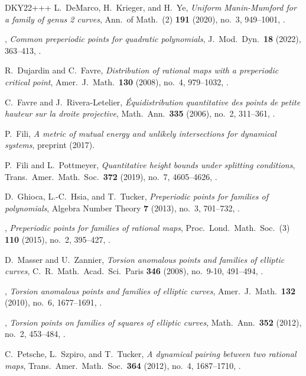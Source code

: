 \begin{thebibliography}{DKY22+++}
L.~DeMarco, H.~Krieger, and H.~Ye,
\emph{Uniform Manin-Mumford for a family of genus 2 curves},
Ann.\ of Math.~(2) \textbf{191} (2020), no.~3, 949--1001,
. 

\bysame, 
\emph{Common preperiodic points for quadratic polynomials},
J.~Mod.\ Dyn.\ \textbf{18} (2022), 363--413,
.

R.~Dujardin and C.~Favre,
\emph{Distribution of rational maps with a preperiodic critical point},
Amer.~J.\ Math.\ \textbf{130} (2008), no.~4, 979--1032,
.

C.~Favre and J.~Rivera-Letelier,
\emph{\'Equidistribution quantitative des points de petite hauteur sur la droite projective}, 
Math.\ Ann.\ \textbf{335} (2006), no.~2, 311--361,
.

P.~Fili,
\emph{A metric of mutual energy and unlikely intersections for dynamical systems}, preprint  (2017). 

P.~Fili and L.~Pottmeyer,
\emph{Quantitative height bounds under splitting conditions},
Trans.\ Amer.\ Math.\ Soc.\ \textbf{372} (2019), no.~7, 4605--4626,
.

D.~Ghioca, L.-C.~Hsia, and T.~Tucker,
\emph{Preperiodic points for families of polynomials},
Algebra Number Theory \textbf{7} (2013), no.~3, 701--732,
.

\bysame, 
\emph{Preperiodic points for families of rational maps},
Proc.\ Lond.\ Math.\ Soc.~(3) \textbf{110} (2015), no.~2, 395--427,
.

D.~Masser and U.~Zannier,
\emph{Torsion anomalous points and families of elliptic curves},
C.\ R.\ Math.\ Acad.\ Sci.\ Paris \textbf{346} (2008), no.~9-10, 491--494,
.

\bysame, 
\emph{Torsion anomalous points and families of elliptic curves},
Amer.~J.\ Math.\ \textbf{132} (2010), no.~6, 1677--1691,
.

\bysame,
\emph{Torsion points on families of squares of elliptic curves},
Math.\ Ann.\ \textbf{352} (2012), no.~2, 453--484,
.

C.~Petsche, L.~Szpiro, and T.~Tucker,
\emph{A dynamical pairing between two rational maps},
Trans.\ Amer.\ Math.\ Soc.\ \textbf{364} (2012), no.~4, 1687--1710,
.


\end{thebibliography}

